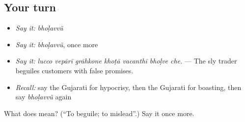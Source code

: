 \subsection*{Your turn}
\begin{itemize}
\raggedright
  \item \emph{Say it:} \emph{bhoḷavvũ}
  \item \emph{Say it:} \emph{bhoḷavvũ}, once more
  \item \emph{Say it:} \emph{lucco vepārī grāhkone khoṭā vacanthī bhoḷve che.} — The sly trader beguiles customers with false promises.
  \item \emph{Recall:} say the Gujarati for hypocrisy, then the Gujarati for boasting, then say \emph{bhoḷavvũ} again
\end{itemize}

\begin{tcolorbox}[breakable,colback=teal!4,colframe=teal!35!black,title={Before you move on}]
What does  mean? (\textquotedblleft{}To beguile; to mislead\textquotedblright{}.) Say it once more.
\end{tcolorbox}
